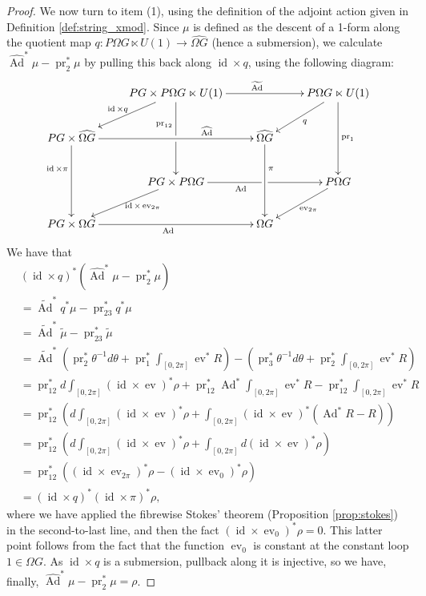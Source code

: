 \documentclass[12pt]{amsart}
\DeclareMathOperator{\id}{id}
\DeclareMathOperator{\Ad}{Ad}
\DeclareMathOperator{\pr}{pr}
\DeclareMathOperator{\ev}{ev}
\theoremstyle{plain}
\theoremstyle{definition}
\theoremstyle{remark}
\numberwithin{equation}{section}
\newcommand{\<}{\langle}
\renewcommand{\>}{\rangle}
\newcommand{\Omegahat}[1]{\widehat{\Omega #1}}
\begin{document}
\begin{proof}
We now turn to item (1), using the definition of the adjoint action given in Definition \ref{def:string_xmod}.
Since $\mu$ is defined as the descent of a 1-form along the quotient map $q\colon P\Omega G \ltimes U(1) \to \Omegahat{G}$ (hence a submersion), we calculate $\widehat{\Ad}^*\mu - \pr_2^*\mu$ by pulling this back along $\id\times q$, using the following diagram:
\[
  \xymatrix{
    &PG\times P\Omega G \ltimes U(1) \ar[rr]^{\widetilde{\Ad}}\ar[dd]_(0.35){\pr_{12}}|!{[dl];[dr]}\hole \ar[dl]_{\id\times q}&& P\Omega G\ltimes U(1) \ar[dd]^{\pr_1}  \ar[dl]^q\\
    PG\times \Omegahat{G} \ar[rr]^(0.7){\widehat{\Ad}} \ar[dd]_(0.35){\id\times \pi} && \Omegahat{G} \ar[dd]^(0.35){\pi} \\
    & PG\times P\Omega G \ar[rr]_(0.4){\Ad}|!{[ur];[dr]}\hole \ar[dl]^(0.4){\id\times \ev_{2\pi}}&& P\Omega G\ar[dl]^{\ev_{2\pi}}\\
    PG\times \Omega G \ar[rr]_{\Ad} && \Omega G
  }
\]
We have that 
\begin{align*}
  &(\id\times q)^*\left(\widehat{\Ad}^*\mu - \pr_2^*\mu\right) \\
  & = \widetilde{\Ad}^*q^*\mu - \pr_{23}^*q^*\mu\\
  & = \widetilde{\Ad}^*\tilde \mu - \pr_{23}^*\tilde \mu\\
  & = \widetilde{\Ad}^*\left(\pr_2^*\theta^{-1}d\theta + \pr_1^*\int_{[0,2\pi]}\ev^*R\right) - \left(\pr_3^*\theta^{-1}d\theta + \pr_{2}^*\int_{[0,2\pi]}\ev^*R \right)\\
  & = \pr_{12}^*d\int_{[0,2\pi]}(\id\times \ev)^*\rho + \pr_{12}^*\Ad^*\int_{[0,2\pi]}\ev^*R - \pr_{12}^*\int_{[0,2\pi]}\ev^*R\\
  & = \pr_{12}^*\left(d\int_{[0,2\pi]}(\id\times \ev)^*\rho + \int_{[0,2\pi]}(\id\times \ev)^*(\Ad^*R - R)\right)\\
  & = \pr_{12}^*\left(d\int_{[0,2\pi]}(\id\times \ev)^*\rho + \int_{[0,2\pi]}d(\id\times \ev)^*\rho\right)\\
  & = \pr_{12}^*((\id\times\ev_{2\pi})^*\rho - (\id\times\ev_0)^*\rho)\\
  & = (\id\times q)^*(\id\times \pi)^* \rho,
\end{align*}
where we have applied the fibrewise Stokes' theorem (Proposition \ref{prop:stokes}) in the second-to-last line, and then the fact $(\id\times\ev_0)^*\rho=0$. 
This latter point follows from the fact that the function $\ev_0$ is constant at the constant loop $1\in \Omega G$. 
As $\id\times q$ is a submersion, pullback along it is injective, so we have, finally, $\widehat{\Ad}^*\mu - \pr_2^*\mu = \rho$.
\end{proof}
\end{document}
